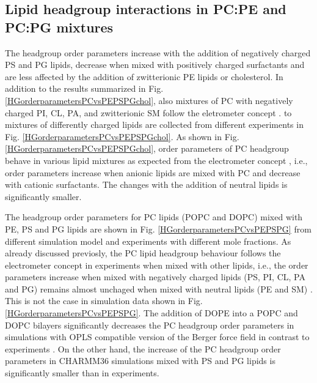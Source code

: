 \documentclass[aps,prl,superscriptaddress,twocolumn]{revtex4}
\begin{document}
\subsection{Lipid headgroup interactions in PC:PE and PC:PG mixtures}
The headgroup 
order parameters increase with the addition of negatively charged PS and PG lipids,
decrease when mixed with positively charged surfactants and
are less affected by the addition of zwitterionic PE lipids or cholesterol.
In addition to the results summarized in Fig. \ref{HGorderparametersPCvsPEPSPGchol},
also mixtures of PC with negatively charged PI, CL, PA, and zwitterionic SM
follow the eletrometer concept \cite{scherer87}.
to mixtures of differently charged
lipids are collected from different experiments in Fig. \ref{HGorderparametersPCvsPEPSPGchol}.
As shown in Fig. \ref{HGorderparametersPCvsPEPSPGchol}, order parameters of PC
headgroup behave in various lipid mixtures as expected from the electrometer concept \cite{seelig87, scherer87},
i.e., order parameters increase when anionic lipids are mixed with PC and decrease with cationic
surfactants. The changes with the addition of neutral lipids is significantly smaller.


The headgroup order parameters for PC lipids (POPC and DOPC)
mixed with PE, PS and PG lipids are shown in Fig. \ref{HGorderparametersPCvsPEPSPG}
from different simulation model and experiments \cite{scherer87} with different
mole fractions. As already discussed previosly, the PC lipid headgroup behaviour
follows the electrometer concept in experiments when mixed with other lipids, i.e., the order
parameters increase when mixed with negatively charged lipids (PS, PI, CL, PA and PG)
remains almost unchaged when mixed with neutral lipids (PE and SM) \cite{scherer87}.
This is not the case in simulation data shown in Fig. \ref{HGorderparametersPCvsPEPSPG}.
The addition of DOPE into a POPC and DOPC bilayers significantly decreases the PC headgroup
order parameters in simulations with OPLS compatible version of the Berger force field \cite{tieleman06}
in contrast to experiments \cite{scherer87}. On the other hand, the increase of the PC
headgroup order parameters in CHARMM36 simulations mixed with PS and PG lipids is significantly
smaller than in experiments.
\end{document}
